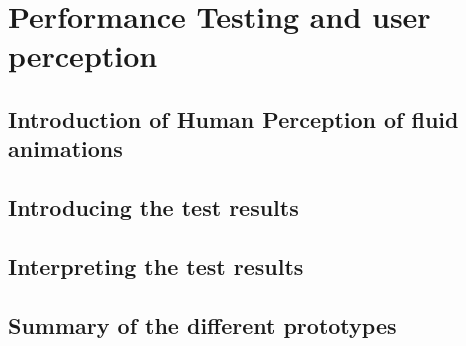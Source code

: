 \chapter{Performance Testing and user perception}
\label{cha:performance}

\section{Introduction of Human Perception of fluid animations}

\section{Introducing the test results}

\section{Interpreting the test results}

\section{Summary of the different prototypes}

